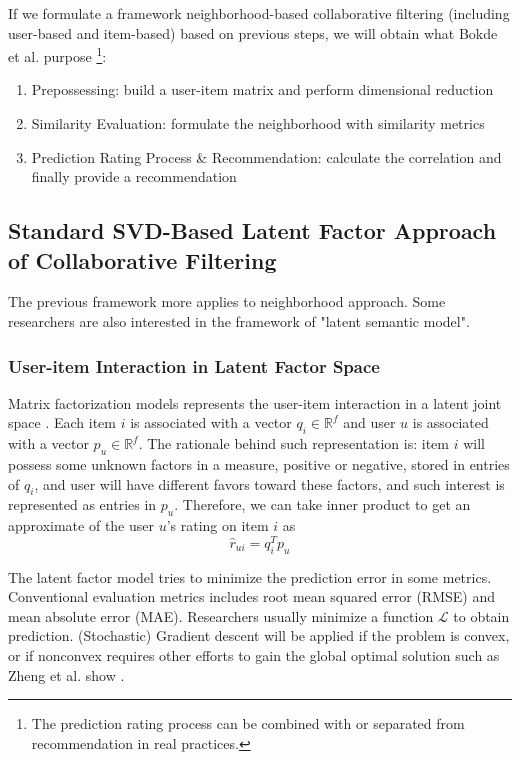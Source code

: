\documentclass[letter paper, 11pt]{article}
\begin{document}
	If we formulate a framework neighborhood-based collaborative filtering (including user-based and item-based) based on previous steps, we will obtain what Bokde et al. purpose \cite{MF-Model-Survey}\footnote{The prediction rating process can be combined with or separated from recommendation in real practices.}:
	
	\begin{enumerate}
		\item Prepossessing:
		build a user-item matrix and perform dimensional reduction
		
		\item Similarity Evaluation:
		formulate the neighborhood with similarity metrics
		
		\item Prediction Rating Process \& Recommendation:
		calculate the correlation and finally provide a recommendation
	\end{enumerate}
	
	\subsection{Standard SVD-Based Latent Factor Approach of Collaborative Filtering} 
	The previous framework more applies to neighborhood approach. Some researchers are also interested in the framework of "latent semantic model". 
	
	\subsubsection{User-item Interaction in Latent Factor Space}
	Matrix factorization models represents the user-item interaction in a latent joint space \cite{MFinRS}. Each item $i$ is associated with a vector $q_i \in \mathbb{R}^f$ and user $u$ is associated with a vector $p_u \in \mathbb{R}^f$. The rationale behind such representation is: item $i$ will possess some unknown factors in a measure, positive or negative, stored in entries of $q_i$, and user will have different favors toward these factors, and such interest is represented as entries in $p_u$. Therefore, we can take inner product to get an approximate of the user $u$'s rating on item $i$ as \cite{MFinRS} 
	\begin{equation}
		\hat{r}_{ui} = q_i^T  p_u 
	\end{equation}
	
	The latent factor model tries to minimize the prediction error in some metrics. Conventional evaluation metrics includes root mean squared error (RMSE) and mean absolute error (MAE). Researchers usually minimize a function $\mathcal{L}$ to obtain prediction. (Stochastic) Gradient descent will be applied if the problem is convex, or if nonconvex requires other efforts to gain the global optimal solution such as Zheng et al. show \cite{RSVD}.
	
\end{document}
